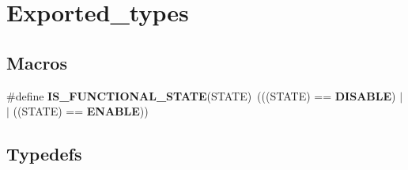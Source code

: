 \section{Exported\+\_\+types}
\label{group__Exported__types}
\subsection*{Macros}
\begin{DoxyCompactItemize}
\item 
\#define \textbf{ I\+S\+\_\+\+F\+U\+N\+C\+T\+I\+O\+N\+A\+L\+\_\+\+S\+T\+A\+TE}(S\+T\+A\+TE)~(((S\+T\+A\+TE) == \textbf{ D\+I\+S\+A\+B\+LE}) $\vert$$\vert$ ((S\+T\+A\+TE) == \textbf{ E\+N\+A\+B\+LE}))
\end{DoxyCompactItemize}
\subsection*{Typedefs}
